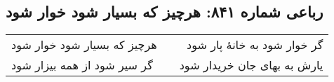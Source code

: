\begin{center}
\section*{رباعی شماره ۸۴۱: هرچیز که بسیار شود خوار شود}
\label{sec:0841}
\begin{longtable}{l p{0.5cm} r}
هرچیز که بسیار شود خوار شود
&&
گر خوار شود به خانهٔ پار شود
\\
گر سیر شود از همه بیزار شود
&&
یارش به بهای جان خریدار شود
\\
\end{longtable}
\end{center}
